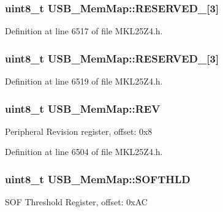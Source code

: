 \subsubsection[{\texorpdfstring{R\+E\+S\+E\+R\+V\+E\+D\+\_\+8}{RESERVED_8}}]{\setlength{\rightskip}{0pt plus 5cm}uint8\+\_\+t U\+S\+B\+\_\+\+Mem\+Map\+::\+R\+E\+S\+E\+R\+V\+E\+D\+\_\mbox{[}3\mbox{]}}\hypertarget{struct_u_s_b___mem_map_ab587ffb40eafb0bd3aaf062064d3b150}{}\label{struct_u_s_b___mem_map_ab587ffb40eafb0bd3aaf062064d3b150}


Definition at line 6517 of file M\+K\+L25\+Z4.\+h.

\subsubsection[{\texorpdfstring{R\+E\+S\+E\+R\+V\+E\+D\+\_\+9}{RESERVED_9}}]{\setlength{\rightskip}{0pt plus 5cm}uint8\+\_\+t U\+S\+B\+\_\+\+Mem\+Map\+::\+R\+E\+S\+E\+R\+V\+E\+D\+\_\mbox{[}3\mbox{]}}\hypertarget{struct_u_s_b___mem_map_ae366f5847b944969f82b5cbd5cdc7da0}{}\label{struct_u_s_b___mem_map_ae366f5847b944969f82b5cbd5cdc7da0}


Definition at line 6519 of file M\+K\+L25\+Z4.\+h.

\subsubsection[{\texorpdfstring{R\+EV}{REV}}]{\setlength{\rightskip}{0pt plus 5cm}uint8\+\_\+t U\+S\+B\+\_\+\+Mem\+Map\+::\+R\+EV}\hypertarget{struct_u_s_b___mem_map_ac918187248616aac7e5223124ea9610d}{}\label{struct_u_s_b___mem_map_ac918187248616aac7e5223124ea9610d}
Peripheral Revision register, offset\+: 0x8 

Definition at line 6504 of file M\+K\+L25\+Z4.\+h.

\subsubsection[{\texorpdfstring{S\+O\+F\+T\+H\+LD}{SOFTHLD}}]{\setlength{\rightskip}{0pt plus 5cm}uint8\+\_\+t U\+S\+B\+\_\+\+Mem\+Map\+::\+S\+O\+F\+T\+H\+LD}\hypertarget{struct_u_s_b___mem_map_a5462ecd3a3fe1425826815c78bfb8120}{}\label{struct_u_s_b___mem_map_a5462ecd3a3fe1425826815c78bfb8120}
S\+OF Threshold Register, offset\+: 0x\+AC 

